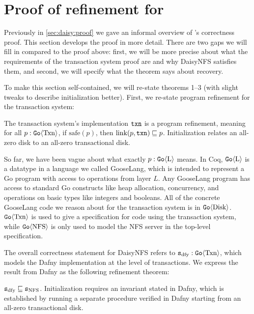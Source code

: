 \section{Proof of refinement for \sys}
\label{appendix:proof}

\setcounter{theorem}{0}

Previously in \cref{sec:daisy:proof} we gave an informal overview of \sys's
correctness proof. This section develops the proof in more detail. There are two
gaps we will fill in compared to the proof above: first, we will be more precise
about what the requirements of the transaction system proof are and why DaisyNFS
satisfies them, and second, we will specify what the theorem says about recovery.

To make this section self-contained, we will re-state theorems 1--3 (with slight
tweaks to describe initialization better). First, we re-state program refinement
for the transaction system:

\begin{theorem}
  The transaction system's implementation $\texttt{txn}$ is a program refinement,
  meaning for all $p : \mathtt{Go}\langle \mathrm{Txn} \rangle$, if $\mathrm{safe}(p)$, then
  $\mathrm{link}(p, \texttt{txn}) \sqsubseteq p$. Initialization relates an all-zero
  disk to an all-zero transactional disk.
  \label{thm:txn-appendix}
\end{theorem}

So far, we have been vague about what exactly $p : \mathtt{Go}\langle \mathrm{L} \rangle$ means. In
Coq, $\mathtt{Go}\langle \mathrm{L} \rangle$ is a datatype in a language we called GooseLang, which is
intended to represent a Go program with access to operations from layer $L$. Any
GooseLang program has access to standard Go constructs like heap allocation,
concurrency, and operations on basic types like integers and booleans. All of
the concrete GooseLang code we reason about for the transaction system is in
$\mathtt{Go}\langle \mathrm{Disk} \rangle$. $\mathtt{Go}\langle \mathrm{Txn} \rangle$ is used to give a specification for code
using the transaction system, while $\mathtt{Go}\langle \mathrm{NFS} \rangle$ is only used to model the
NFS server in the top-level specification.

The overall correctness statement for DaisyNFS refers to
$\texttt{s}_{\mathrm{dfy}} : \mathtt{Go}\langle \mathrm{Txn} \rangle$, which models the Dafny implementation at the level
of transactions. We express the result from Dafny as the following refinement
theorem:

\begin{theorem}
  $\texttt{s}_{\mathrm{dfy}} \sqsubseteq \texttt{s}_{\mathrm{NFS}}$. Initialization requires an invariant stated in Dafny,
  which is established by running a separate  procedure verified in
  Dafny starting from an all-zero transactional disk.
  \label{thm:dafny}
\end{theorem}

